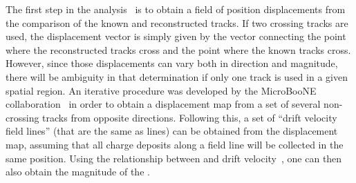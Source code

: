 The first step in the analysis~\cite{bib:uBlaser2019} is to obtain a field of position displacements from the comparison of the known and reconstructed tracks. If two crossing tracks are used, the displacement vector is simply given by the vector connecting the point where the reconstructed tracks cross and the point where the known tracks cross. However, since those displacements can vary both in direction and magnitude, there will be ambiguity in that determination if only one track is used in a given spatial region. An iterative procedure was developed by the MicroBooNE collaboration~\cite{bib:chen2018,bib:uBlaser2019} in order to 
obtain a displacement map from a set of several non-crossing tracks from opposite directions. Following this, a set of ``drift velocity field lines'' (that are the same as \efield lines) can be obtained from the displacement map, assuming that all charge deposits along a field line will be collected in the same position. Using the relationship between \efield and drift velocity~\cite{Li:2015rqa,Walkowiak:2000wf}, one can then also obtain 
the magnitude of the \efield.



 


